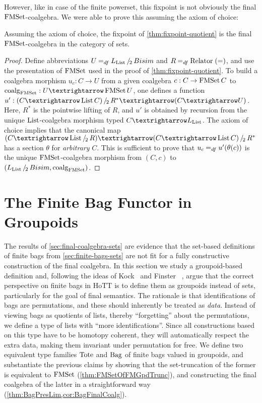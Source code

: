 \documentclass[final,a4paper,USenglish,cleveref]{lipics-v2021}
\begin{document}
However, like in case of the finite powerset, this fixpoint is not obviously the final $\FMSet$-coalgebra.
We were able to prove this assuming the axiom of choice:
\begin{theorem}\label{thm:final-quotient}
  Assuming the axiom of choice, the fixpoint of \cref{thm:fixpoint-quotient} is the final $\FMSet$-coalgebra in the category of sets.
\end{theorem}
\begin{proof}
  Define abbreviations $U \DefEq \SetQuot[\Lim{\List}][\Bisim]$ and $R \DefEq \Relator\; (=)$, and use the presentation of $\FMSet$ used in the proof of \cref{thm:fixpoint-quotient}.
  To build a coalgebra morphism $u_c : C → U$ from a given coalgebra $c : C \to \FMSet C$ to $\coalg{\FMSet} : U → \FMSet U$,
  one defines a function $u' : \SetQuot[(C → \List C)][R^*] → (C → U)$.
  Here, $R^*$ is the pointwise lifting of $R$,
  and $u'$ is obtained by recursion from the unique $\List$-coalgebra morphism typed $C → \Lim{\List}$.
  The axiom of choice implies that the canonical map $(C → \SetQuot[\List][R]) → \SetQuot[(C → \List C)][R^*]$
  has a section $\theta$ for \emph{arbitrary} $C$.
  This is sufficient to prove that $u_c \DefEq u'(\theta(c))$ is the unique $\FMSet$-coalgebra morphism from $(C,c)$ to $(\SetQuot[\Lim{\List}][\Bisim], \coalg{\FMSet})$.
\end{proof}

\section{The Finite Bag Functor in Groupoids}\label{sec:finite-bags-groupoids}

The results of \cref{sec:final-coalgebra-sets} are evidence that the set-based definitions of finite bags from \cref{sec:finite-bags-sets} are not fit for a fully constructive construction of the final coalgebra. In this section we study a groupoid-based definition and, following the ideas of Kock~\cite{Kock2012} and Finster \etal~\cite{Finster2021},  argue that the correct perspective on finite bags in HoTT is to define them as groupoids instead of sets, particularly for the goal of final semantics.
The rationale is that identifications of bags are permutations, and these should inherently be treated as \emph{data}.
Instead of viewing bags as quotients of lists, thereby \enquote{forgetting} about the permutations,
we define a type of lists with \enquote{more identifications}.
Since all constructions based on this type have to be homotopy coherent,
they will automatically respect the extra data,
making them invariant under permutation for free.
We define two equivalent type families $\Tote$ and $\Bag$ of finite bags valued in groupoids,
and substantiate the previous claims by showing that the set-truncation of the former is equivalent to $\FMSet$ (\cref{thm:FMSetOfFMGpdTrunc}),
and constructing the final coalgebra of the latter in a straightforward way %
(\cref{thm:BagPresLim,cor:BagFinalCoalg}).
\end{document}
